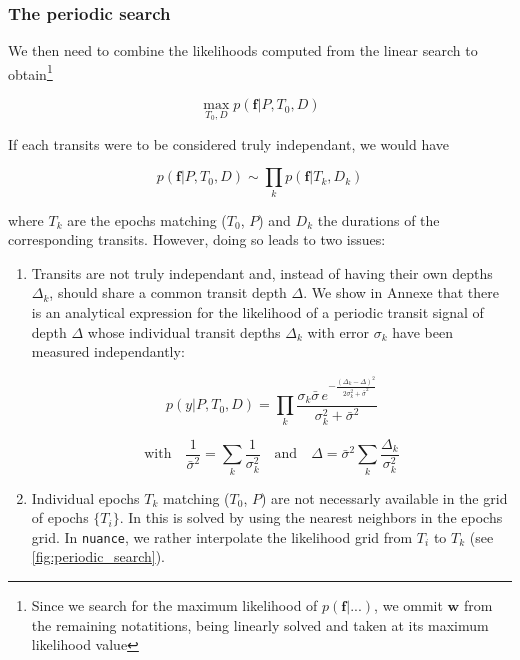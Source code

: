 \documentclass{aastex631}
\begin{document}
\subsubsection{The periodic search}

We then need to combine the likelihoods computed from the linear search to obtain\footnote{Since we search for the maximum likelihood of $p(\bm{f}\vert...)$, we ommit $\bm{w}$ from the remaining notatitions, being linearly solved and taken at its maximum likelihood value} 

$$\max_{T_0, D}p(\bm{f} \vert P, T_0 ,D)$$

If each transits were to be considered truly independant, we would have

$$p(\bm{f} \vert P, T_0 ,D) \sim \prod_k p(\bm{f} \vert T_k ,D_k)$$

where $T_k$ are the epochs matching ($T_0$, $P$) and $D_k$ the durations of the corresponding transits. However, doing so leads to two issues:
\begin{enumerate}

    \item Transits are not truly independant and, instead of having their own depths $\Delta_k$, should share a common transit depth $\Delta$. We show in Annexe that there is an analytical expression for the likelihood of a periodic transit signal of depth $\Delta$ whose individual transit depths $\Delta_k$ with error $\sigma_k$ have been measured independantly:

    $$p(y \vert P, T_0 ,D) =  \prod_k \frac{\sigma_k \bar\sigma \, e^{- \frac{\left(\Delta_k - \Delta\right)^{2}}{2 \sigma_k^{2} + \bar\sigma^{2}}}}{\sigma_k^{2} + \bar\sigma^{2}}$$
    
    $$\text{with} \quad  
    \frac{1}{\bar\sigma^2} = \sum_{k}\frac{1}{\sigma_k^2} \quad \text{and} \quad
    \Delta = \bar\sigma^2 \sum_{k}{\frac{\Delta_k}{\sigma_k^2}}$$
    
    \item Individual epochs $T_k$ matching ($T_0$, $P$) are not necessarly available in the grid of epochs $\{T_i\}$. In \cite{foreman2016} this is solved by using the nearest neighbors in the epochs grid. In \texttt{nuance}, we rather interpolate the likelihood grid from $T_i$ to $T_k$ (see \autoref{fig:periodic_search}).

\end{enumerate}
\end{document}
